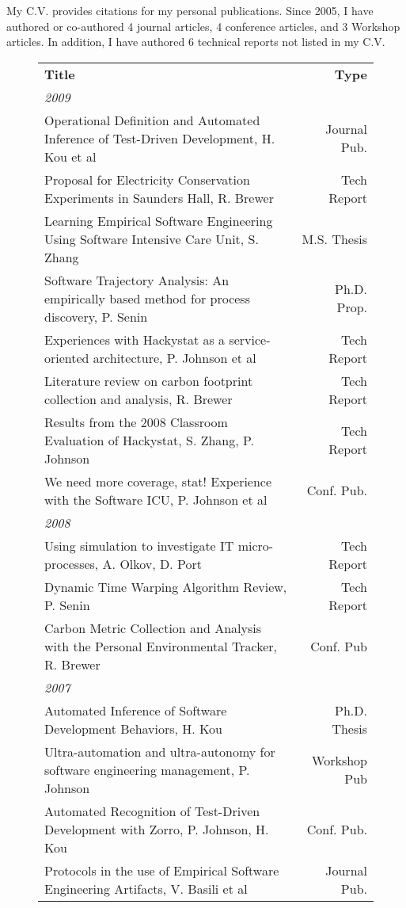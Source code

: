 \documentclass[11pt]{article}
\begin{document}
My C.V. provides citations for my personal publications.  Since 2005, I have authored or co-authored 4 journal articles, 4 conference articles, and 3 Workshop articles. In addition, I have authored 6 technical reports not listed in my C.V.


\begin{figure}[!ht]
\small
\begin{tabular}{p{5.5in}r} \hline
{\bf Title} & {\bf Type}  \\
{\em 2009} & \\
Operational Definition and Automated Inference of Test-Driven Development, H. Kou et al  & Journal Pub. \\
Proposal for Electricity Conservation Experiments in Saunders Hall, R. Brewer &  Tech Report \\
Learning Empirical Software Engineering Using Software Intensive Care Unit, S. Zhang  & M.S. Thesis \\
Software Trajectory Analysis: An empirically based method for process discovery, P. Senin  & Ph.D. Prop. \\
Experiences with Hackystat as a service-oriented architecture, P. Johnson et al  & Tech Report \\
Literature review on carbon footprint collection and analysis, R. Brewer  & Tech Report \\
Results from the 2008 Classroom Evaluation of Hackystat, S. Zhang, P. Johnson  & Tech Report \\
We need more coverage, stat! Experience with the Software ICU, P. Johnson et al  & Conf. Pub. \\
{\em 2008} & \\
Using simulation to investigate {IT} micro-processes, A. Olkov, D. Port  & Tech Report \\
Dynamic Time Warping Algorithm Review, P. Senin  & Tech Report \\
Carbon Metric Collection and Analysis with the Personal Environmental Tracker, R. Brewer  & Conf. Pub \\
{\em 2007} & \\
Automated Inference of Software Development Behaviors, H. Kou  & Ph.D. Thesis \\
Ultra-automation and ultra-autonomy for software engineering management, P. Johnson  & Workshop Pub \\
Automated Recognition of Test-Driven Development with Zorro, P. Johnson, H. Kou  & Conf. Pub. \\
Protocols in the use of Empirical Software Engineering Artifacts, V. Basili et al  & Journal Pub. \\

\end{tabular}
\end{figure}
\end{document}
